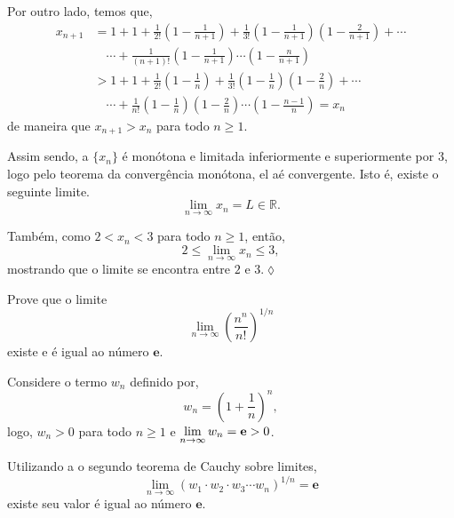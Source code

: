 Por outro lado, temos que,
\begin{align*}
    x_{n+1}&=1+1+\frac{1}{2!}\left(1-\frac{1}{n+1}\right)+\frac{1}{3!}\left(1-\frac{1}{n+1}\right)\left(1-\frac{2}{n+1}\right)+\cdots\\[2ex]
           &\quad \cdots+\frac{1}{(n+1)!}\left(1-\frac{1}{n+1}\right)\cdots\left(1-\frac{n}{n+1}\right)\\[2ex]
           &>1+1+\frac{1}{2!}\left(1-\frac{1}{n}\right)+\frac{1}{3!}\left(1-\frac{1}{n}\right)\left(1-\frac{2}{n}\right)+\cdots\\[2ex]
           &\quad \cdots+\frac{1}{n!}\left(1-\frac{1}{n}\right)\left(1-\frac{2}{n}\right)\cdots\left(1-\frac{n-1}{n}\right)=x_n
\end{align*}
de maneira que $x_{n+1}>x_n$ para todo $n\geq 1$.

Assim sendo, a \seq $\{x_n\}$ \'{e} mon\'{o}tona e limitada inferiormente e superiormente por $3$, logo pelo teorema da converg\^{e}ncia mon\'{o}tona, el a\'{e} convergente. Isto \'{e}, existe o seguinte limite.
\begin{equation*}
    \lim_{n\to\infty}x_n=L\in \mathbb{R}.
\end{equation*}

Tamb\'{e}m, como $2<x_n<3$ para todo $n\geq 1$, ent\~{a}o,
\begin{equation*}
    2\leq \lim_{n\to\infty}x_n \leq 3,
\end{equation*}
mostrando que o limite se encontra entre $2$ e $3$.\hfill \(\lozenge\)


\begin{exer}
Prove que o limite
\begin{equation*}
    \lim_{n\to\infty}\left(\dfrac{n^n }{n!}\right)^{1/n}
\end{equation*}
existe e \'{e} igual ao n\'{u}mero $\mathbf{e}$.
\end{exer}

\solo Considere o termo $w_n$ definido por,
\begin{equation*}
    w_n=\left(1+\frac{1}{n}\right)^n,
\end{equation*}
logo, $w_n>0$ para todo $n\geq 1$ e $\displaystyle{\lim_{n\to\infty}w_n=\mathbf{e}>0}$.

Utilizando a o segundo teorema de Cauchy sobre limites,
\begin{equation*}
\lim_{n\to\infty}(w_1\cdot w_2\cdot w_3\cdots w_n)^{1/n}=\mathbf{e}
\end{equation*}
existe seu valor \'{e} igual ao n\'{u}mero $\mathbf{e}$.

